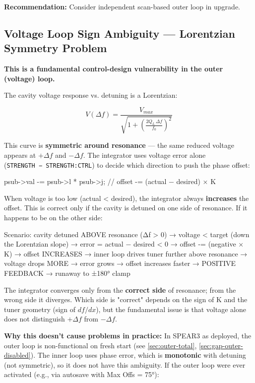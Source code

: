 \textbf{Recommendation:} Consider independent scan-based outer loop in upgrade.

\subsection{Voltage Loop Sign Ambiguity --- Lorentzian Symmetry Problem}\label{sec:gap-sign}


\textbf{This is a fundamental control-design vulnerability in the outer (voltage) loop.}

The cavity voltage response vs. detuning is a Lorentzian:

\begin{equation}\label{eq:lorentzian}
  V(\Delta f) = \frac{V_{max}}{\sqrt{1 + \left(\frac{2 Q_L \,\Delta f}{f_0}\right)^2}}
\end{equation}

This curve is \textbf{symmetric around resonance} --- the same reduced voltage appears at \(+\Delta f\) and \(-\Delta f\). The integrator uses voltage error alone (\texttt{STRENGTH\ −\ STRENGTH:\allowbreak{}CTRL}) to decide which direction to push the phase offset:

\begin{codeblock}
psub->val -= psub->l * psub->j;   // offset -= (actual − desired) × K
\end{codeblock}

When voltage is too low (actual \textless{} desired), the integrator always \textbf{increases} the offset. This is correct only if the cavity is detuned on one side of resonance. If it happens to be on the other side:

\begin{sigblock}
Scenario: cavity detuned ABOVE resonance (Δf > 0)
  → voltage < target  (down the Lorentzian slope)
  → error = actual − desired < 0
  → offset -= (negative × K) → offset INCREASES
  → inner loop drives tuner further above resonance
  → voltage drops MORE → error grows → offset increases faster
  → POSITIVE FEEDBACK → runaway to ±180° clamp
\end{sigblock}

The integrator converges only from the \textbf{correct side} of resonance; from the wrong side it diverges. Which side is "correct" depends on the sign of K and the tuner geometry (sign of \(df/dx\)), but the fundamental issue is that voltage alone does not distinguish \(+\Delta f\) from \(-\Delta f\).

\textbf{Why this doesn't cause problems in practice:} In SPEAR3 as deployed, the outer loop is non-functional on fresh start (see \cref{sec:outer-total}, \cref{sec:gap-outer-disabled}). The inner loop uses phase error, which is \textbf{monotonic} with detuning (not symmetric), so it does not have this ambiguity. If the outer loop were ever activated (e.g., via autosave with Max Offs = 75°):

